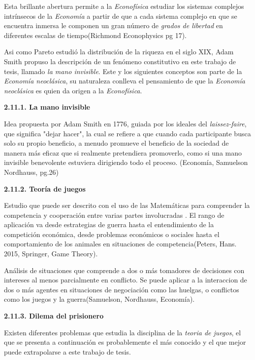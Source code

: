 Esta brillante abertura permite a la \textit{Econofísica} estudiar los sistemas complejos intrínsecos de la \textit{Economía} a partir de que a cada sistema complejo en que se encuentra inmersa le componen un gran número de \textit{grados de libertad} en diferentes escalas de tiempo(Richmond Econophysics pg 17).
\newline

Asi como Pareto estudió la distribución de la riqueza en el siglo XIX, Adam Smith propuso la descripción de un fenómeno constitutivo en este trabajo de tesis, llamado \textit{la mano invisible}. Este y los siguientes conceptos son parte de la \textit{Economía neoclásica}, su naturaleza conlleva el pensamiento de que la \textit{Economía neoclásica} es quien da origen a la \textit{Econofísica}.
\newpage

{
\Large  \textbf{2.11.1. La mano invisible} 
}

Idea propuesta por Adam Smith en  1776, guiada por los ideales del \textit{laissez-faire}, que significa "dejar hacer", la cual se refiere a que cuando cada participante busca solo su propio beneficio, a menudo promueve el beneficio de la sociedad de manera más eficaz que si realmente pretendiera promoverlo, como si una mano invisible benevolente estuviera dirigiendo todo el proceso. (Economía, Samuelson Nordhauss, pg.26)
\newline



{
\Large  \textbf{2.11.2. Teoría de juegos} 
}

Estudio que puede ser descrito con el uso de las Matemáticas para comprender la competencia y cooperación entre varias partes involucradas . El rango de aplicación va desde estrategias de guerra hasta el entendimiento de la competición económica, desde problemas económicos o sociales hasta el comportamiento de los animales en situaciones de competencia(Peters, Hans. 2015, Springer, Game Theory).

Análisis de situaciones que comprende a dos o más tomadores de decisiones con intereses al menos parcialmente en conflicto. Se puede aplicar a la interaccion de dos o más agentes en situaciones de negociación como las huelgas, o conflictos como los juegos y la guerra(Samuelson, Nordhauss, Economía).


{
\Large  \textbf{2.11.3. Dilema del prisionero} 
}

Existen diferentes problemas que estudia la disciplina de la \textit{teoria de juegos}, el que se presenta a continuación es probablemente el más conocido y el que mejor puede extrapolarse a este trabajo de tesis. 

